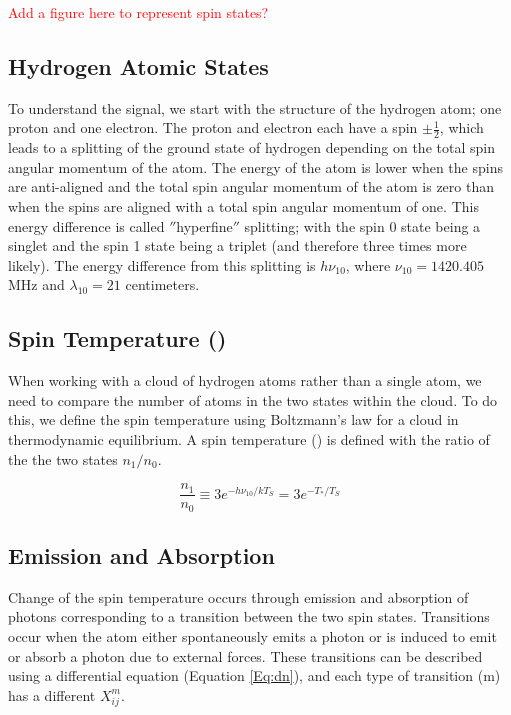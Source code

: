 \textcolor{red}{Add a figure here to represent spin states?}

\subsection{Hydrogen Atomic States}
To understand the \cm signal, we start with the structure of the hydrogen atom; one proton and one electron. The proton and electron each have a spin $\pm \frac{1}{2}$, which leads to a splitting of the ground state of hydrogen depending on the total spin angular momentum of the atom. The energy of the atom is lower when the spins are anti-aligned and the total spin angular momentum of the atom is zero than when the spins are aligned with a total spin angular momentum of one. This energy difference is called $''$hyperfine$''$ splitting; with the spin 0 state being a singlet and the spin 1 state being a triplet (and therefore three times more likely). The energy difference from this splitting is $h \nu_{10}$, where $\nu_{10}=1420.405$ MHz and $\lambda_{10} =  21$ centimeters.  

\subsection{Spin Temperature (\ts)}
When working with a cloud of hydrogen atoms rather than a single atom, we need to compare the number of atoms in the two states within the cloud. To do this, we define the spin temperature using Boltzmann's law for a cloud in thermodynamic equilibrium. A spin temperature (\ts) is defined with the ratio of the the two states $n_1/n_0$. 

\begin{equation}\label{Eq:T_s}
\frac{n_1}{n_0} \equiv 3 e^{- h \nu_{10} / kT_S} = 3 e^{-T_*/T_S}
\end{equation} 

\subsection{Emission and Absorption} \label{Sec:dT_S}
Change of the spin temperature occurs through emission and absorption of \cm photons corresponding to a transition between the two spin states. Transitions occur when the atom either spontaneously emits a photon or is induced to emit or absorb a photon due to external forces. These transitions can be described using a differential equation (Equation \ref{Eq:dn}), and each type of transition (m) has a different $X^m_{ij}$. 

